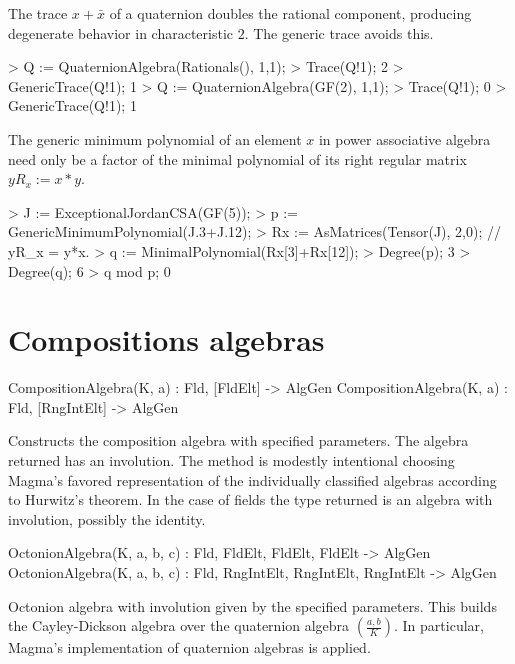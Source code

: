 \documentclass{documentation}
\begin{document}
\begin{example}[TenGeneric]

The trace $x+\bar{x}$ of a quaternion doubles the rational component, producing
degenerate behavior in characteristic $2$.  The generic trace avoids this.
\begin{code}
> Q := QuaternionAlgebra(Rationals(), 1,1);
> Trace(Q!1);        
2
> GenericTrace(Q!1);
1
> Q := QuaternionAlgebra(GF(2), 1,1);  
> Trace(Q!1);
0
> GenericTrace(Q!1);
1
\end{code}

The generic minimum polynomial of an element $x$ in power associative algebra
need only be a factor of the minimal polynomial of its right regular matrix $yR_x:=x*y$.

\begin{code}
> J := ExceptionalJordanCSA(GF(5));
> p := GenericMinimumPolynomial(J.3+J.12);
> Rx := AsMatrices(Tensor(J), 2,0);     // yR_x = y*x.
> q := MinimalPolynomial(Rx[3]+Rx[12]); 
> Degree(p);
3
> Degree(q);
6
> q mod p;
0
\end{code}
\end{example}

\section{Compositions algebras}

\begin{intrinsics}
CompositionAlgebra(K, a) : Fld, [FldElt] -> AlgGen
CompositionAlgebra(K, a) : Fld, [RngIntElt] -> AlgGen
\end{intrinsics}

Constructs the composition algebra with specified parameters.  The algebra returned
has an involution.  
The method is modestly intentional choosing Magma's favored representation of
the individually classified algebras according to Hurwitz's theorem.  In the case of
fields the type returned is an algebra with involution, possibly the identity.


\begin{intrinsics}
OctonionAlgebra(K, a, b, c) : Fld, FldElt, FldElt, FldElt -> AlgGen
OctonionAlgebra(K, a, b, c) : Fld, RngIntElt, RngIntElt, RngIntElt -> AlgGen
\end{intrinsics}

Octonion algebra with involution given by the specified parameters.
This builds the Cayley-Dickson algebra over the quaternion algebra
$\left(\frac{a,b}{K}\right)$.  In particular, Magma's implementation
of quaternion algebras is applied.
\end{document}
